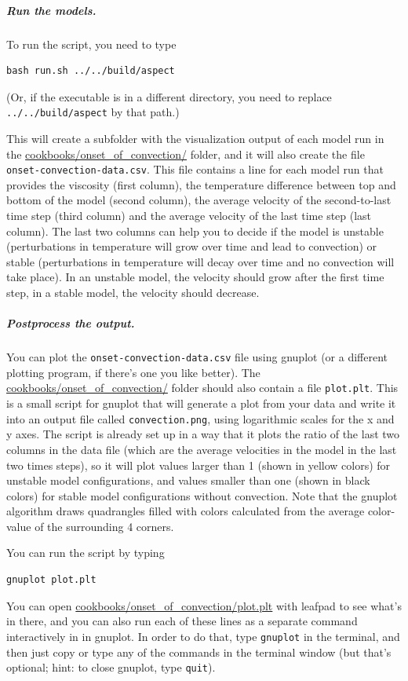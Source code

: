 \subparagraph{Run the models.}
To run the script, you need to type 
\begin{verbatim}
bash run.sh ../../build/aspect
\end{verbatim}
(Or, if the \aspect{} executable is in a different directory, you need to replace \texttt{../../build/aspect} by that path.)

This will create a subfolder with the visualization output of each model run in the \url{cookbooks/onset_of_convection/} folder, 
and it will also create the file \texttt{onset-convection-data.csv}. This file contains a line for each model run that provides
the viscosity (first column), the temperature difference between top and bottom of the model (second column), the average velocity of the second-to-last time step (third column) and the average velocity of the last time step (last column). 
The last two columns can help you to decide if the model is unstable (perturbations in temperature will grow over time and lead to convection) or stable (perturbations in temperature will decay over time and no convection will take place). 
In an unstable model, the velocity should grow after the first time step, in a stable model, the velocity should decrease. 

\subparagraph{Postprocess the output.}
You can plot the \texttt{onset-convection-data.csv} file using gnuplot (or a different plotting program, if there's one you like better). The \url{cookbooks/onset_of_convection/} folder should also contain a file \texttt{plot.plt}. This is a small script for gnuplot that will generate a plot from your data and write it into an output file called \texttt{convection.png}, using logarithmic scales for the x and y axes. The script is already set up in a way that it plots the ratio of the last two columns in the data file (which are the average velocities in the model in the last two times steps), so it will plot values larger than 1 (shown in yellow colors) for unstable model configurations, and values smaller than one (shown in black colors) for stable model configurations without convection. 
Note that the gnuplot algorithm draws quadrangles filled with colors calculated from the average color-value of the surrounding 4 corners.

You can run the script by typing 
\begin{verbatim}
gnuplot plot.plt
\end{verbatim}

You can open \url{cookbooks/onset_of_convection/plot.plt} with leafpad to see what's in there, and you can also run each of these lines as a separate command interactively in in gnuplot. In order to do that, type \texttt{gnuplot} in the terminal, and then just copy or type any of the commands in the terminal window (but that's optional; hint: to close gnuplot, type \texttt{quit}). 

